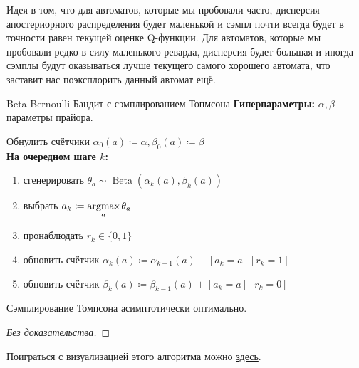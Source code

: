 Идея в том, что для автоматов, которые мы пробовали часто, дисперсия апостериорного распределения будет маленькой и сэмпл почти всегда будет в точности равен текущей оценке Q-функции. Для автоматов, которые мы пробовали редко в силу маленького реварда, дисперсия будет большая и иногда сэмплы будут оказываться лучше текущего самого хорошего автомата, что заставит нас поэксплорить данный автомат ещё.

\begin{algorithm}{Beta-Bernoulli Бандит с сэмплированием Топмсона}
\textbf{Гиперпараметры:} $\alpha, \beta$ --- параметры прайора.

\vspace{0.3cm}
Обнулить счётчики $\alpha_0(a) \coloneqq \alpha, \beta_0(a) \coloneqq \beta$ \\
\textbf{На очередном шаге $k$:}
\begin{enumerate}
    \item сгенерировать $\theta_a \sim \operatorname{Beta}(\alpha_k(a), \beta_k(a))$
    \item выбрать $a_k \coloneqq \mathop{\mathrm{argmax}}\limits_{a} \theta_a$
    \item пронаблюдать $r_k \in \{0, 1\}$
    \item обновить счётчик $\alpha_k(a) \coloneqq \alpha_{k-1}(a) + [a_k = a][r_k = 1]$
    \item обновить счётчик $\beta_k(a) \coloneqq \beta_{k-1}(a) + [a_k = a][r_k = 0]$
\end{enumerate}
\end{algorithm}

\begin{theorem}
Сэмплирование Томпсона асимптотически оптимально.
\begin{proof}[Без доказательства]\end{proof}
\end{theorem}

\begin{example}
Поиграться с визуализацией этого алгоритма можно \href{https://learnforeverlearn.com/bandits/}{здесь}.
\end{example}


